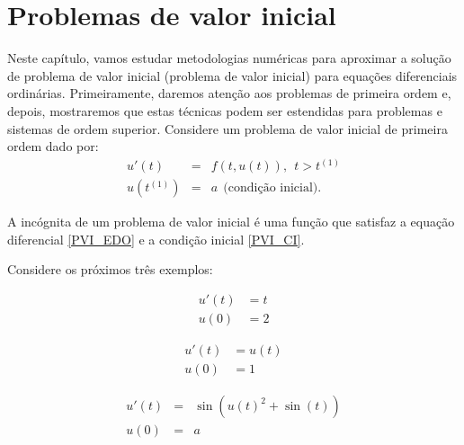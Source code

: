 
%

\chapter{Problemas de valor inicial}
Neste capítulo, vamos estudar metodologias numéricas para aproximar a solução de problema de valor inicial (problema de valor inicial) para equações diferenciais ordinárias. Primeiramente, daremos atenção aos problemas de primeira ordem e, depois, mostraremos que estas técnicas podem ser estendidas para problemas e sistemas de ordem superior. Considere um problema de valor inicial de primeira ordem dado por:
\begin{subequations}\label{PVI}
\begin{eqnarray}
  u'(t) &=& f(t, u(t)),~~t>t^{(1)}\label{PVI_EDO}\\
  u(t^{(1)}) &=& a ~~ \text{(condição inicial)}.\label{PVI_CI}
\end{eqnarray}
\end{subequations}

A incógnita de um problema de valor inicial é uma função que satisfaz a equação diferencial \eqref{PVI_EDO} e a condição inicial \eqref{PVI_CI}.

Considere os próximos três exemplos:
\begin{ex}
\begin{eqnarray}
   u'(t) &=t\\
   u(0) &= 2
\end{eqnarray}
\end{ex}

\begin{ex}
\begin{eqnarray}
   u'(t) &=u(t)\\
            u(0) &= 1
\end{eqnarray}
\end{ex}

\begin{ex}
\begin{eqnarray}
   u'(t) &=&\sin(u(t)^2+\sin(t))\\
            u(0) &=& a
\end{eqnarray}
\end{ex}

